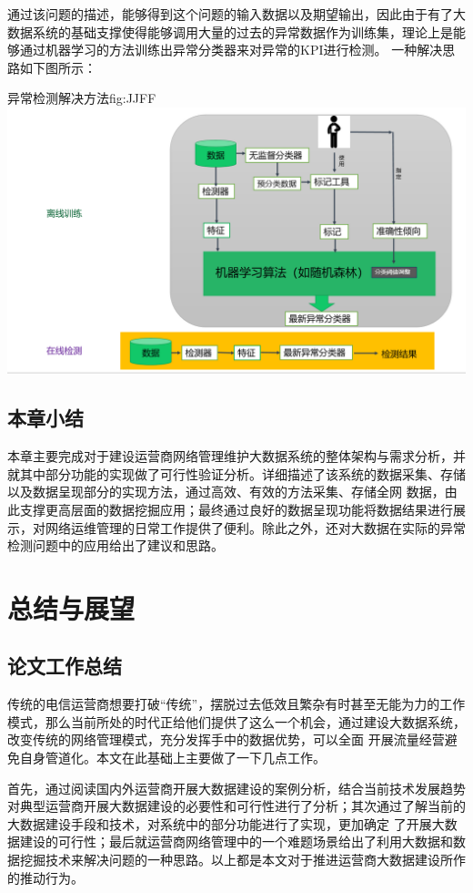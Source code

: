 \documentclass{HustGraduPaper}
\begin{document}
    通过该问题的描述，能够得到这个问题的输入数据以及期望输出，因此由于有了大数据系统的基础支撑使得能够调用大量的过去的异常数据作为训练集，理论上是能够通过机器学习的方法训练出异常分类器来对异常的KPI进行检测。
    一种解决思路如下图所示：

    \begin{generalfig}{异常检测解决方法}{fig:JJFF} 
        \includegraphics[width = \textwidth]{Figures/JJFF.png} 
    \end{generalfig}

    \subsection{本章小结}
    本章主要完成对于建设运营商网络管理维护大数据系统的整体架构与需求分析，并就其中部分功能的实现做了可行性验证分析。详细描述了该系统的数据采集、存储以及数据呈现部分的实现方法，通过高效、有效的方法采集、存储全网
    数据，由此支撑更高层面的数据挖掘应用；最终通过良好的数据呈现功能将数据结果进行展示，对网络运维管理的日常工作提供了便利。除此之外，还对大数据在实际的异常检测问题中的应用给出了建议和思路。
    \section{总结与展望}
    \subsection{论文工作总结}

    传统的电信运营商想要打破“传统”，摆脱过去低效且繁杂有时甚至无能为力的工作模式，那么当前所处的时代正给他们提供了这么一个机会，通过建设大数据系统，改变传统的网络管理模式，充分发挥手中的数据优势，可以全面
    开展流量经营避免自身管道化。本文在此基础上主要做了一下几点工作。

    首先，通过阅读国内外运营商开展大数据建设的案例分析，结合当前技术发展趋势对典型运营商开展大数据建设的必要性和可行性进行了分析；其次通过了解当前的大数据建设手段和技术，对系统中的部分功能进行了实现，更加确定
    了开展大数据建设的可行性；最后就运营商网络管理中的一个难题场景给出了利用大数据和数据挖掘技术来解决问题的一种思路。以上都是本文对于推进运营商大数据建设所作的推动行为。
\end{document}

